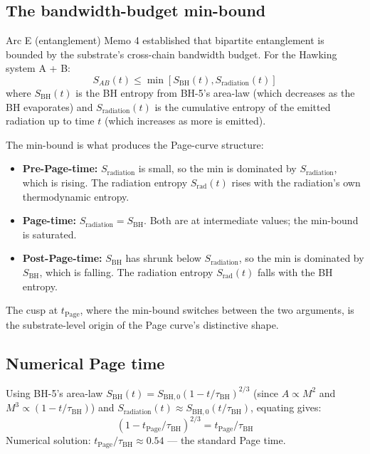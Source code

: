 \documentclass[11pt,a4paper]{article}
\begin{document}
\subsection{The bandwidth-budget min-bound}

Arc E (entanglement) Memo 4 established that bipartite entanglement is bounded by the substrate's cross-chain bandwidth budget. For the Hawking system A + B:
\[
S_{AB}(t) \leq \min[S_{\mathrm{BH}}(t), S_{\mathrm{radiation}}(t)]
\]
where $S_{\mathrm{BH}}(t)$ is the BH entropy from BH-5's area-law (which decreases as the BH evaporates) and $S_{\mathrm{radiation}}(t)$ is the cumulative entropy of the emitted radiation up to time $t$ (which increases as more is emitted).

The min-bound is what produces the Page-curve structure:

\begin{itemize}[noitemsep]
  \item \textbf{Pre-Page-time:} $S_{\mathrm{radiation}}$ is small, so the min is dominated by $S_{\mathrm{radiation}}$, which is rising. The radiation entropy $S_{\mathrm{rad}}(t)$ rises with the radiation's own thermodynamic entropy.
  \item \textbf{Page-time:} $S_{\mathrm{radiation}} = S_{\mathrm{BH}}$. Both are at intermediate values; the min-bound is saturated.
  \item \textbf{Post-Page-time:} $S_{\mathrm{BH}}$ has shrunk below $S_{\mathrm{radiation}}$, so the min is dominated by $S_{\mathrm{BH}}$, which is falling. The radiation entropy $S_{\mathrm{rad}}(t)$ falls with the BH entropy.
\end{itemize}

The cusp at $t_{\mathrm{Page}}$, where the min-bound switches between the two arguments, is the substrate-level origin of the Page curve's distinctive shape.

\subsection{Numerical Page time}

Using BH-5's area-law $S_{\mathrm{BH}}(t) = S_{\mathrm{BH},0}(1 - t/\tau_{\mathrm{BH}})^{2/3}$ (since $A \propto M^2$ and $M^3 \propto (1 - t/\tau_{\mathrm{BH}})$) and $S_{\mathrm{radiation}}(t) \approx S_{\mathrm{BH},0}(t/\tau_{\mathrm{BH}})$, equating gives:
\[
(1 - t_{\mathrm{Page}}/\tau_{\mathrm{BH}})^{2/3} = t_{\mathrm{Page}}/\tau_{\mathrm{BH}}
\]
Numerical solution: $t_{\mathrm{Page}}/\tau_{\mathrm{BH}} \approx 0.54$ --- the standard Page time.
\end{document}
